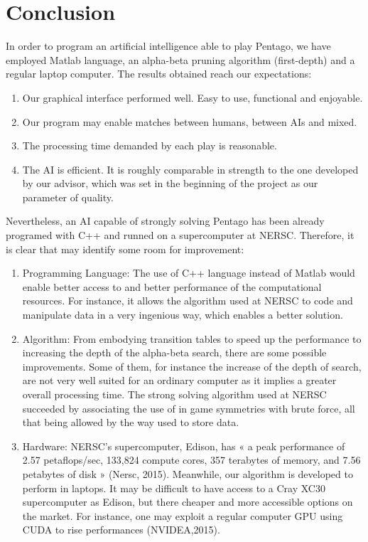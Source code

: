 \section {Conclusion}

In order to program an artificial intelligence able to play Pentago, we have
employed Matlab language, an alpha-beta pruning algorithm (first-depth) and a
regular laptop computer. The results obtained reach our expectations:

\begin{enumerate}

	\item Our graphical interface performed well. Easy to use, functional and
	enjoyable.

	\item Our program may enable matches between humans, between AIs and mixed.

	\item The processing time demanded by each play is reasonable.

	\item The AI is efficient. It is roughly comparable in strength to the one
	developed by our advisor, which was set in the beginning of the project as our
	parameter of quality.

\end{enumerate}

Nevertheless, an AI capable of strongly solving Pentago has been already
programed with C++ and runned on a supercomputer at NERSC. Therefore, it is
clear that may identify some room for improvement:

\begin{enumerate}
  	\item Programming Language: The use of C++ language instead of Matlab would
  	enable better access to and better performance of the computational
  	resources. For instance, it allows the algorithm used at NERSC to code and
  	manipulate data in a very ingenious way, which enables a better solution.

	\item Algorithm: From embodying transition tables to speed up the performance
	to increasing the depth of the alpha-beta search, there are some possible
	improvements. Some of them, for instance the increase of the depth of search,
	are not very well suited for an ordinary computer as it implies a greater
	overall processing time. The strong solving algorithm used at NERSC succeeded
	by associating the use of in game symmetries with brute force, all that being
	allowed by the way used to store data.

	\item Hardware: NERSC's supercomputer, Edison, has « a peak performance of
	2.57 petaflops/sec, 133,824 compute cores, 357 terabytes of memory, and 7.56
	petabytes of disk » (Nersc, 2015). Meanwhile, our algorithm is developed to
	perform in laptops. It may be difficult to have access to a Cray XC30
	supercomputer as Edison, but there cheaper and more accessible options on the
	market. For instance, one may exploit a regular computer GPU using CUDA to
	rise performances (NVIDEA,2015).

\end{enumerate}

